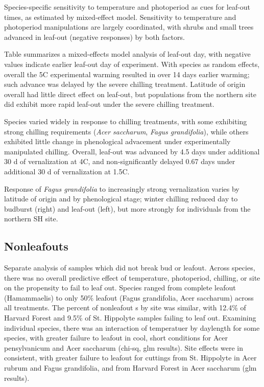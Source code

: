 \documentclass[11pt]{article}
\begin{document}
Species-specific sensitivity to temperature and photoperiod as cues for leaf-out times, as estimated by mixed-effect model. Sensitivity to temperature and photoperiod manipulations are largely coordinated, with shrubs and small trees advanced in leaf-out (negative responses) by both factors.

Table  summarizes a mixed-effects model analysis of leaf-out day, with negative values indicate earlier leaf-out day of experiment. With species as random effects, overall the 5\degree C experimental warming resulted in over 14 days earlier warming; such advance was delayed by the severe chilling treatment. Latitude of origin overall had little direct effect on leaf-out, but populations from the northern site did exhibit more rapid leaf-out under the severe chilling treatment.

Species varied widely in response to chilling treatments, with some exhibiting strong chilling requirements (\emph{Acer saccharum}, \emph{Fagus grandifolia}), while others exhibited little change in phenological advacement under experimentally manipulated chilling. Overall, leaf-out was advanced by 4.5 days under additional 30 d of vernalization at 4\degree C, and non-significantly delayed 0.67 days under additional 30 d of vernalization at 1.5\degree C.

Response of \emph{Fagus grandifolia} to increasingly strong vernalization varies by latitude of origin and by phenological stage; winter chilling reduced day to budburst (right) and leaf-out (left), but more strongly for individuals from the northern SH site.


\subsection{Nonleafouts}

Separate analysis of samples which did not break bud or leafout. Across species, there was no overall predictive effect of temperature, photoperiod, chilling, or site on the propensity to fail to leaf out. 
Species ranged from complete leafout (Hamammaelis) to only 50\% leafout (Fagus grandifolia, Acer saccharum) across all treatments. The percent of nonleafout s by site was similar, with 12.4\% of Harvard Forest and 9.5\% of St. Hippolyte samples failing to leaf out. Examining individual species,  there was an interaction of temperatuer by daylength for some species, with greater failure to leafout in cool, short conditions for Acer pensylvanicum  and Acer saccharum (chi-sq, glm results). Site effects were in consistent, with greater failure to leafout for cuttings from St. Hippolyte in Acer rubrum and Fagus grandifolia, and from Harvard Forest in Acer saccharum (glm results).
 
\end{document}
